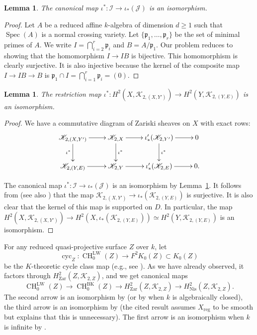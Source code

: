 \documentclass[11pt]{article}
\numberwithin{equation}{section}
\let\mathcal\mathscr
\newcommand{\BK}{\mathrm{BK}}
\newcommand{\LW}{\mathrm{LW}}
\newtheorem{lem}[thm]{Lemma}
\theoremstyle{definition}
\newcommand{\lemref}{Lemma~\ref}
\newcommand{\sI}{{\mathcal I}}
\newcommand{\sJ}{{\mathcal J}}
\newcommand{\sK}{{\mathcal K}}
\DeclareMathOperator{\CH}{CH}
\DeclareMathOperator{\cyc}{cyc}
\DeclareMathOperator{\Spec}{Spec}
\newcommand{\Nis}{\mathrm{Nis}}
\newcommand{\reg}{\mathrm{reg}}
\newcommand{\zar}{\mathrm{Zar}}
\newcommand{\fp}{\mathfrak{p}}
\begin{document}
\begin{lem}\label{lem:ideal}
The canonical map
$\iota^* \colon \sI \to \iota_*(\sJ)$ is an isomorphism.
\end{lem}
\begin{proof}
Let $A$ be a reduced
affine $k$-algebra of dimension $d \ge 1$ such that
$\Spec(A)$ is a normal crossing variety.
Let $\{\fp_1, \ldots , \fp_r\}$ be the set of minimal primes of $A$.
We write $I = \bigcap^{r}_{i = 2} \fp_i$ and
$B = {A}/{\fp_1}$. Our problem reduces to showing that the homomorphism
$I \to IB$ is bijective. This homomorphism is clearly surjective.
It is also injective because the kernel of the composite map
$I \to IB \to B$ is $\fp_1 \cap I = \bigcap^{r}_{i = 1}
\fp_i = (0)$.
\end{proof}

\begin{lem}\label{lem:Surface-K-0}
The restriction
map $\iota^*\colon H^2(X, \sK_{2, (X, Y')}) \to H^2(Y, \sK_{2, (Y, E)})$ is an
isomorphism.
\end{lem}
\begin{proof}
We have a commutative diagram of Zariski sheaves on $X$ with exact rows:
\begin{equation}\label{eqn:Surface-K-0-0}
\begin{array}{c}
\xymatrix{
\sK_{2, (X, Y')} \ar[r] \ar[d]_{\iota^*} & \sK_{2,X} \ar[r] \ar[d]^{\iota^*} &
\iota'_*(\sK_{2,Y'}) \ar[d]^{\iota^*} \ar[r] & 0 \\
\sK_{2, (Y, E)} \ar[r] & \sK_{2,Y} \ar[r] &
\iota'_*(\sK_{2,E}) \ar[r] & 0.}
\end{array}
\end{equation}

The canonical map
$\iota^* \colon \sI \to \iota_*(\sJ)$ is an isomorphism by \lemref{lem:ideal}.
It follows from \cite{Keune} (see also \cite[Th.\,0.2]{GW}) that
the map $\sK_{2, (X,Y')} \to \iota_*(\sK_{2,(Y,E)})$ is surjective.
It is also clear that the kernel of this map is supported on $D$.
In particular, the map $H^2(X,\sK_{2, (X,Y')}) \to
H^2(X, \iota_*(\sK_{2,(Y,E)})) \simeq H^2(Y, \sK_{2,(Y,E)})$ is an isomorphism.
\end{proof}

For any reduced quasi-projective surface $Z$ over $k$, let
\[\cyc_Z\colon \CH^{\LW}_0(Z) \to F^2K_0(Z)\subset K_0(Z)\]
be the $K$-theoretic cycle class map (e.g., see \cite[Lem.\,3.12]{BK}).
As we have already observed, it factors through $H^2_{\zar}(Z, \sK_{2,Z})$, and we
get canonical maps
\begin{equation}\label{eqn:cyc-cl-map}
\CH^{\LW}_0(Z) \to \CH_0^{\BK}(Z) \to
H^2_{\zar}(Z, \sK_{2,Z}) \to H^2_\Nis(Z, \sK_{2,Z}).
\end{equation}
The second arrow is an isomorphism by \cite[Th.\,8.1]{BKS}
(or by \cite{LevineBlochFormula} when $k$ is algebraically closed),
the third arrow is an isomorphism by \cite[Th.\,2.5]{Kato-Saito-2}
(the cited result assumes $X_\reg$ to be smooth but \cite[\S3.5]{GKris2}
explains that this is unnecessary). The first arrow is an isomorphism when
$k$ is infinite by \cite[Cor.\,7.8]{BKS}.
\end{document}
